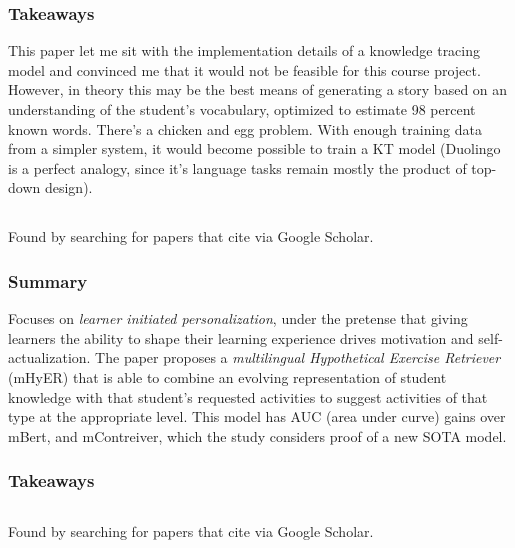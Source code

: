 \documentclass[
	letterpaper, %
]{jdf}
\begin{document}
\subsubsection{Takeaways}
This paper let me sit with the implementation details of a knowledge tracing model and convinced me that it would not be feasible for this course project. However, in theory this may be the best means of generating a story based on an understanding of the student's vocabulary, optimized to estimate 98 percent known words. There's a chicken and egg problem. With enough training data from a simpler system, it would become possible to train a KT model (Duolingo is a perfect analogy, since it's language tasks remain mostly the product of top-down design).

\subsection{}

Found by searching for papers that cite \cite{important_adaptive_learning_exercise_generation} via Google Scholar.

\subsubsection{Summary}
Focuses on \textit{learner initiated personalization}, under the pretense that giving learners the ability to shape their learning experience drives motivation and self-actualization. The paper proposes a \textit{multilingual Hypothetical Exercise Retriever} (mHyER) that is able to combine an evolving representation of student knowledge with that student's requested activities to suggest activities of that type at the appropriate level. This model has AUC (area under curve) gains over mBert, and mContreiver, which the study considers proof of a new SOTA model.

\subsubsection{Takeaways}


\subsection{}
Found by searching for papers that cite \cite{important_adaptive_learning_exercise_generation} via Google Scholar.
\end{document}
